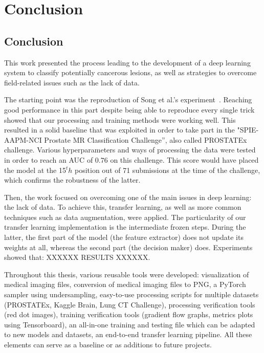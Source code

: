 
\chapter{Conclusion}
\label{ch:conclusions}

\section{Conclusion}
\setlength{\marginparwidth}{3cm}\leavevmode {}This work presented the process leading to the development of a deep learning system to classify potentially cancerous lesions, as well as strategies to overcome field-related issues such as the lack of data.

The starting point was the reproduction of Song et al.'s experiment~\cite{07}. Reaching good performance in this part despite being able to reproduce every single trick showed that our processing and training methods were working well. This resulted in a solid baseline that was exploited in order to take part in the "SPIE-AAPM-NCI Prostate MR Classification Challenge”, also called PROSTATEx challenge. Various hyperparameters and ways of processing the data were tested in order to reach an AUC of $0.76$ on this challenge. This score would have placed the model at the 15$^th$ position out of 71 submissions at the time of the challenge, which confirms the robustness of the latter.

Then, the work focused on overcoming one of the main issues in deep learning: the lack of data. To achieve this, transfer learning, as well as more common techniques such as data augmentation, were applied. The particularity of our transfer learning implementation is the intermediate frozen steps. During the latter, the first part of the model (the feature extractor) does not update its weights at all, whereas the second part (the decision maker) does. Experiments showed that: XXXXXX RESULTS XXXXXX.

Throughout this thesis, various reusable tools were developed: visualization of medical imaging files, conversion of medical imaging files to PNG, a PyTorch sampler using undersampling, easy-to-use processing scripts for multiple datasets (PROSTATEx, Kaggle Brain, Lung CT Challenge), processing verification tools (red dot images), training verification tools (gradient flow graphs, metrics plots using Tensorboard), an all-in-one training and testing file which can be adapted to new models and datasets, an end-to-end transfer learning pipeline. All these elements can serve as a baseline or as additions to future projects.

